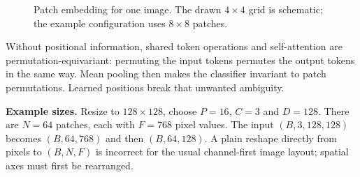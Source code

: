 \documentclass[11pt,a4paper,oneside]{report}
\begin{document}
\begin{figure}[h]
\centering
{}
\caption{Patch embedding for one image. The drawn $4\times4$ grid is
schematic; the example configuration uses $8\times8$ patches.}
\end{figure}

Without positional information, shared token operations and self-attention
are permutation-equivariant: permuting the input tokens permutes the output
tokens in the same way. Mean pooling then makes the classifier invariant to
patch permutations. Learned positions break that unwanted ambiguity.

\textbf{Example sizes.} Resize to $128\times128$, choose $P=16$, $C=3$ and
$D=128$. There are $N=64$ patches, each with $F=768$ pixel values. The input
$(B,3,128,128)$ becomes $(B,64,768)$ and then $(B,64,128)$.
A plain reshape directly from pixels to $(B,N,F)$ is incorrect for the usual
channel-first image layout; spatial axes must first be rearranged.

\newpage
\end{document}
